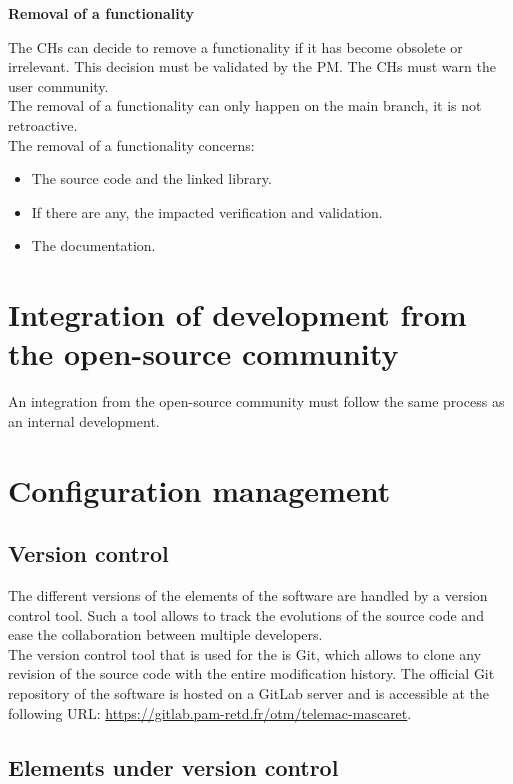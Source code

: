 \textbf{Removal of a functionality}

The CHs can decide to remove a functionality if it has become obsolete or
irrelevant. This decision must be validated by the PM\@. The CHs must warn the
user community.\\

The removal of a functionality can only happen on the main branch, it is not
retroactive.\\

The removal of a functionality concerns:
\begin{itemize}
\item The source code and the linked library.
\item If there are any, the impacted verification and validation.
\item The documentation.
\end{itemize}

\section{Integration of development from the open-source community}
\label{devint}

An integration from the open-source community must follow the same process as
an internal development.

\section{Configuration management}
\label{conf}

\subsection{Version control}

The different versions of the elements of the \telemacsystem{} software are
handled by a version control tool. Such a tool allows to track the evolutions
of the source code and ease the collaboration between multiple developers\@.\\

The version control tool that is used for the \telemacsystem{} is Git, which 
allows to clone any revision of the source code with the entire modification
history. The official Git repository of the software is hosted on a GitLab
server and is accessible at the following URL:
\url{https://gitlab.pam-retd.fr/otm/telemac-mascaret}.

\subsection{Elements under version control}

